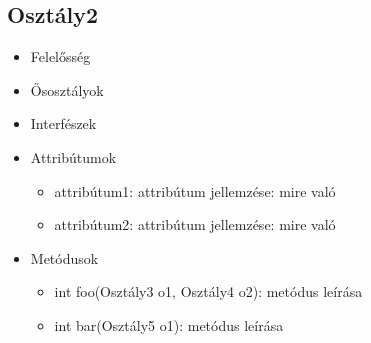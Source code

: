 \subsection{Osztály2}
\begin{itemize}
\item Felelősség\\
\item Ősosztályok\\
\item Interfészek\\
\item Attribútumok\\
	\begin{itemize}
		\item attribútum1: attribútum jellemzése: mire való
		\item attribútum2: attribútum jellemzése: mire való
	\end{itemize}
\item Metódusok\\
	\begin{itemize}
		\item int foo(Osztály3 o1, Osztály4 o2): metódus leírása
		\item int bar(Osztály5 o1): metódus leírása
	\end{itemize}
\end{itemize}
